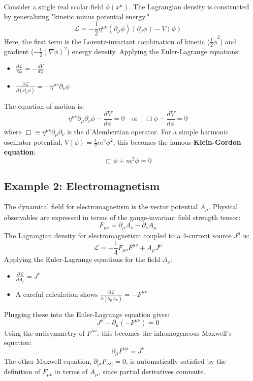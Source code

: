 \documentclass[11pt, a4paper]{report}
\begin{document}
Consider a single real scalar field $\phi(x^\mu)$. The Lagrangian density is constructed by generalizing "kinetic minus potential energy."
\begin{equation}
    \mathcal{L} = -\frac{1}{2}\eta^{\mu\nu}(\partial_\mu\phi)(\partial_\nu\phi) - V(\phi)
\end{equation}
Here, the first term is the Lorentz-invariant combination of kinetic ($\frac{1}{2}\dot{\phi}^2$) and gradient ($-\frac{1}{2}(\nabla\phi)^2$) energy density. Applying the Euler-Lagrange equations:
\begin{itemize}
    \item $\frac{\partial\mathcal{L}}{\partial\phi} = -\frac{dV}{d\phi}$
    \item $\frac{\partial\mathcal{L}}{\partial(\partial_\mu\phi)} = -\eta^{\mu\nu}\partial_\nu\phi$
\end{itemize}
The equation of motion is:
\begin{equation}
    \eta^{\mu\nu}\partial_\mu\partial_\nu\phi - \frac{dV}{d\phi} = 0 \quad \text{or} \quad \Box\phi - \frac{dV}{d\phi} = 0
\end{equation}
where $\Box \equiv \eta^{\mu\nu}\partial_\mu\partial_\nu$ is the d'Alembertian operator. For a simple harmonic oscillator potential, $V(\phi) = \frac{1}{2}m^2\phi^2$, this becomes the famous \textbf{Klein-Gordon equation}:
\begin{equation}
    \Box\phi + m^2\phi = 0
\end{equation}

\subsection*{Example 2: Electromagnetism}

The dynamical field for electromagnetism is the vector potential $A_\mu$. Physical observables are expressed in terms of the gauge-invariant field strength tensor:
\begin{equation}
    F_{\mu\nu} = \partial_\mu A_\nu - \partial_\nu A_\mu
\end{equation}
The Lagrangian density for electromagnetism coupled to a 4-current source $J^\mu$ is:
\begin{equation}
    \mathcal{L} = -\frac{1}{4}F_{\mu\nu}F^{\mu\nu} + A_\mu J^\mu
\end{equation}
Applying the Euler-Lagrange equations for the field $A_\nu$:
\begin{itemize}
    \item $\frac{\partial\mathcal{L}}{\partial A_\nu} = J^\nu$
    \item A careful calculation shows $\frac{\partial\mathcal{L}}{\partial(\partial_\mu A_\nu)} = -F^{\mu\nu}$
\end{itemize}
Plugging these into the Euler-Lagrange equation gives:
\[
    J^\nu - \partial_\mu(-F^{\mu\nu}) = 0
\]
Using the antisymmetry of $F^{\mu\nu}$, this becomes the inhomogeneous Maxwell's equation:
\begin{equation}
    \partial_\mu F^{\nu\mu} = J^\nu
\end{equation}
The other Maxwell equation, $\partial_{[\mu}F_{\nu\lambda]}=0$, is automatically satisfied by the definition of $F_{\mu\nu}$ in terms of $A_\mu$, since partial derivatives commute.
\end{document}
